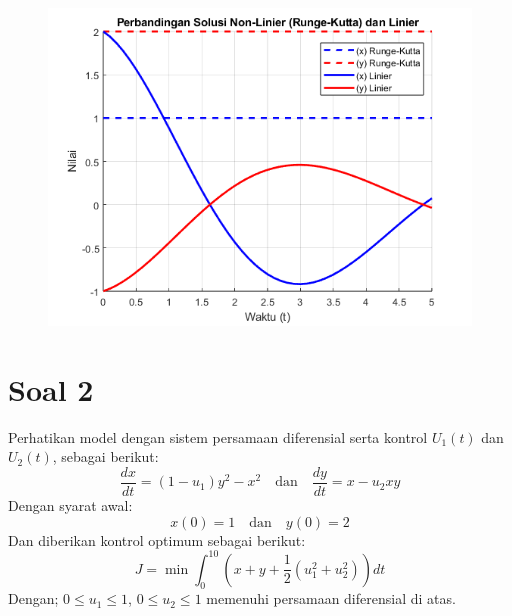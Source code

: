 \documentclass{article}
\begin{document}
\begin{enumerate}[label=\alph*.]
    \begin{figure}[h!] 
      \centering
      \includegraphics[width=0.7\linewidth]{EAS Nomor 1.png}
      \label{fig:simulasi2}
    \end{figure}
    
\end{enumerate}


\pagebreak
\section*{Soal 2}

Perhatikan model dengan sistem persamaan diferensial serta kontrol $U_1(t)$ dan $U_2(t)$, sebagai berikut:
\[
\frac{dx}{dt}=(1-u_1)y^2-x^2 \quad \text{dan} \quad \frac{dy}{dt} = x-u_2xy
\]
Dengan syarat awal:
\[
x(0) = 1 \quad \text{dan}\quad y(0) = 2
\]
Dan diberikan kontrol optimum sebagai berikut:
\[
J = \min \int_{0}^{10} \left(x+y+\frac{1}{2}(u_1^2+u_2^2)\right) dt
\]
Dengan; $0 \leq u_1 \leq 1 $, $0 \leq u_2 \leq 1$ memenuhi persamaan diferensial di atas.
\end{document}
